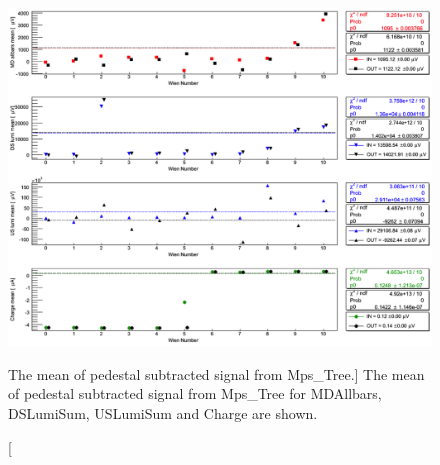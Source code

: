 \begin{singlespace}
\begin{figure}[!h]
	\centering
	\includegraphics[width=15.0cm]{figures/pedestalSum}
	\caption
	[The mean of pedestal subtracted signal from Mps\_Tree.]
	{The mean of pedestal subtracted signal from Mps\_Tree for MDAllbars, DSLumiSum, USLumiSum and Charge are shown.}
	\label{fig:pedestalSum}
\end{figure}
\end{singlespace}

